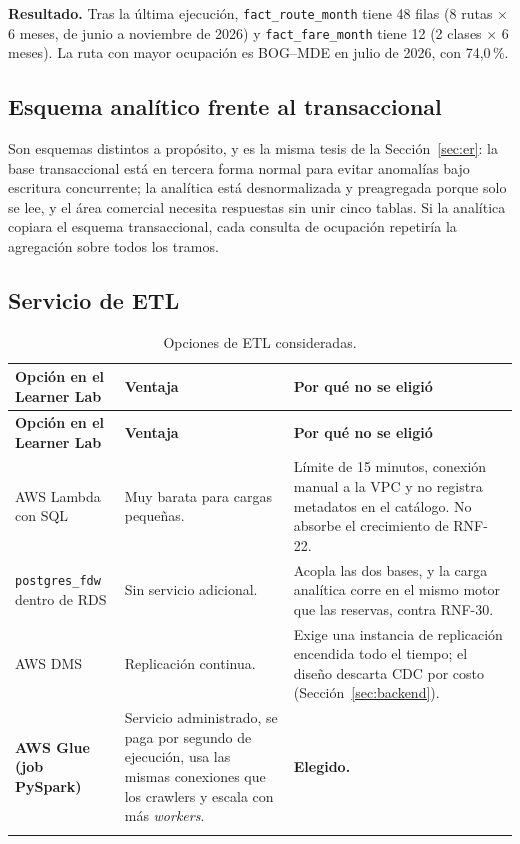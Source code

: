 \textbf{Resultado.} Tras la última ejecución, \texttt{fact\_route\_month} tiene 48 filas (8 rutas $\times$ 6 meses, de junio a noviembre de 2026) y \texttt{fact\_fare\_month} tiene 12 (2 clases $\times$ 6 meses). La ruta con mayor ocupación es BOG--MDE en julio de 2026, con 74,0\,\%.

\subsection{Esquema analítico frente al transaccional}
Son esquemas distintos a propósito, y es la misma tesis de la Sección~\ref{sec:er}: la base transaccional está en tercera forma normal para evitar anomalías bajo escritura concurrente; la analítica está desnormalizada y preagregada porque solo se lee, y el área comercial necesita respuestas sin unir cinco tablas. Si la analítica copiara el esquema transaccional, cada consulta de ocupación repetiría la agregación sobre todos los tramos.

\subsection{Servicio de ETL}
\begin{longtable}{@{}L{3.6cm} L{6.0cm} L{6.0cm}@{}}
\toprule \textbf{Opción en el Learner Lab} & \textbf{Ventaja} & \textbf{Por qué no se eligió} \\ \midrule \endfirsthead
\toprule \textbf{Opción en el Learner Lab} & \textbf{Ventaja} & \textbf{Por qué no se eligió} \\ \midrule \endhead
AWS Lambda con SQL & Muy barata para cargas pequeñas. & Límite de 15 minutos, conexión manual a la VPC y no registra metadatos en el catálogo. No absorbe el crecimiento de RNF-22. \\
\texttt{postgres\_fdw} dentro de RDS & Sin servicio adicional. & Acopla las dos bases, y la carga analítica corre en el mismo motor que las reservas, contra RNF-30. \\
AWS DMS & Replicación continua. & Exige una instancia de replicación encendida todo el tiempo; el diseño descarta CDC por costo (Sección~\ref{sec:backend}). \\
\textbf{AWS Glue (job PySpark)} & Servicio administrado, se paga por segundo de ejecución, usa las mismas conexiones que los crawlers y escala con más \emph{workers}. & \textbf{Elegido.} \\
\bottomrule
\caption{Opciones de ETL consideradas.}
\end{longtable}

